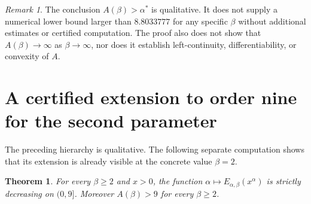 \documentclass[11pt,a4paper]{article}
\theoremstyle{plain}
\newtheorem{theorem}{Theorem}[section]
\theoremstyle{remark}
\newtheorem*{remark}{Remark}
\begin{document}
\begin{remark}
The conclusion $A(\beta)>\alpha^*$ is qualitative. It does not supply a
numerical lower bound larger than $8.8033777$ for any specific $\beta$ without
additional estimates or certified computation. The proof also does not
show that $A(\beta)\to\infty$ as $\beta\to\infty$, nor does it establish
left-continuity, differentiability, or convexity of $A$.
\end{remark}

\section{A certified extension to order nine for the second parameter}
\label{sec:beta2-certificate}
The preceding hierarchy is qualitative. The following separate computation
shows that its extension is already visible at the concrete value $\beta=2$.
\begin{theorem}\label{thm:beta2-nine}
For every $\beta\geq2$ and $x>0$, the function
$\alpha\mapsto E_{\alpha,\beta}(x^\alpha)$ is strictly decreasing on $(0,9]$.
Moreover $A(\beta)>9$ for every $\beta\geq2$.
\end{theorem}
\end{document}
